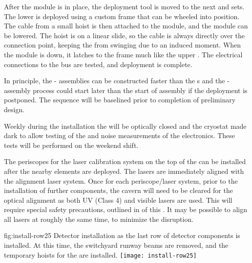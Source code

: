 After the module is in place, the deployment tool is moved to the next  and  sets. 
The lower  is deployed using a custom frame that can be wheeled into position. 
The cable from a small hoist is then attached to the  module, and the module can be lowered. 
The hoist is on a linear slide, so the cable is always directly over the connection point, 
keeping the  from swinging due to an induced moment. 
When the module is down, it latches to the  frame much like the upper . 
The electrical connections to the  bus are tested, and deployment is complete. 

In principle, the - assemblies can be constructed faster than the s and %
the - assembly process could start later than the start of  assembly if the deployment is postponed. The sequence will be baselined prior to completion of preliminary design.

Weekly during the  installation the  will be optically closed and the cryostat made dark to allow testing of the  and noise measurements of the  electronics. 
These tests will be performed on the weekend shift. 

The periscopes for the laser calibration system on the top of the   can be installed after the nearby  elements are deployed. The lasers are immediately aligned with the alignment laser system. 
Once for each periscope/laser system, prior to the installation of further  components, the cavern will need to be cleared for the optical alignment as both UV (Class 4) and visible lasers are used.  
This will require special safety precautions, outlined in \tcchesh %
of this .
It may be possible to align all lasers at roughly the same time, to minimize the disruption.



\begin{dunefigure}{fig:install-row25}
  {Detector installation as the last row of detector components is installed. At this time, the switchyard runway beams are removed, and the temporary hoists for the  are installed.}
\texttt{[image: install-row25]}
\end{dunefigure}


